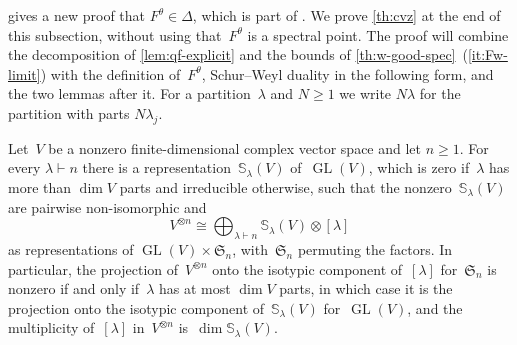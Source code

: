 \documentclass[11pt,letterpaper]{article}
\DeclareMathOperator{\GL}{GL}
\begin{document}
 gives a new proof that $F^\theta \in \Delta$, which is part of \cite[Corollary~3.31]{MR4495838}. We prove \cref{th:cvz} at the end of this subsection, without using that~$F^\theta$ is a spectral point. The proof will combine the decomposition of \cref{lem:qf-explicit} and the bounds of \cref{th:w-good-spec}~(\ref{it:Fw-limit}) with the definition of~$F^\theta$, Schur--Weyl duality in the following form, and the two lemmas after it. For a partition~$\lambda$ and $N \geq 1$ we write $N\lambda$ for the partition with parts $N\lambda_j$.

\begin{theorem}\label{th:schur-weyl}
Let~$V$ be a nonzero finite-dimensional complex vector space and let $n \geq 1$. For every $\lambda \vdash n$ there is a representation~$\mathbb{S}_\lambda(V)$ of~$\GL(V)$, which is zero if~$\lambda$ has more than $\dim V$ parts and irreducible otherwise, such that the nonzero~$\mathbb{S}_\lambda(V)$ are pairwise non-isomorphic and
\[
V^{\otimes n} \cong \bigoplus_{\lambda \vdash n} \mathbb{S}_\lambda(V) \otimes [\lambda]
\]
as representations of $\GL(V) \times \mathfrak{S}_n$, with~$\mathfrak{S}_n$ permuting the factors. In particular, the projection of~$V^{\otimes n}$ onto the isotypic component of~$[\lambda]$ for~$\mathfrak{S}_n$ is nonzero if and only if~$\lambda$ has at most $\dim V$ parts, in which case it is the projection onto the isotypic component of~$\mathbb{S}_\lambda(V)$ for~$\GL(V)$, and the multiplicity of~$[\lambda]$ in~$V^{\otimes n}$ is~$\dim \mathbb{S}_\lambda(V)$.
\end{theorem}
\end{document}
